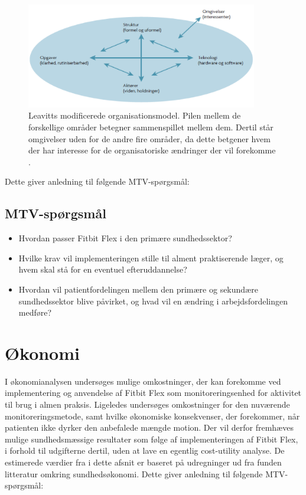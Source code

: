 \begin{figure}[H]
\centering
\includegraphics[width=0.9\textwidth]{figures/leavitt}
\caption{Leavitts modificerede organisationsmodel. Pilen mellem de forskellige områder betegner sammenspillet mellem dem. Dertil står omgivelser uden for de andre fire områder, da dette betgener hvem der har interesse for de organisatoriske ændringer der vil forekomme \citep{mtvhaandbog}.}
\label{fig:leavittmodel}
\end{figure}
\noindent
Dette giver anledning til følgende MTV-spørgsmål:

\subsection{MTV-spørgsmål}
\begin{itemize}
\item Hvordan passer Fitbit Flex i den primære sundhedssektor? 
\item Hvilke krav vil implementeringen stille til alment praktiserende læger, og hvem skal stå for en eventuel efteruddannelse? 
\item  Hvordan vil patientfordelingen mellem den primære og sekundære sundhedssektor blive påvirket, og hvad vil en ændring i arbejdsfordelingen medføre?
\end{itemize}

\section{Økonomi}\label{sec:metode_oeko}
I økonomianalysen undersøges mulige omkostninger, der kan forekomme ved implementering og anvendelse af Fitbit Flex som monitoreringsenhed for aktivitet til brug i almen praksis.
Ligeledes undersøges omkostninger for den nuværende monitoreringsmetode, samt hvilke økonomiske konsekvenser, der forekommer, når patienten ikke dyrker den anbefalede mængde motion.
Der vil derfor fremhæves mulige sundhedsmæssige resultater som følge af implementeringen af Fitbit Flex, i forhold til udgifterne dertil, uden at lave en egentlig cost-utility analyse. 
De estimerede værdier fra i dette afsnit er baseret på udregninger ud fra funden litteratur omkring sundhedsøkonomi.
Dette giver anledning til følgende MTV-spørgsmål: 

